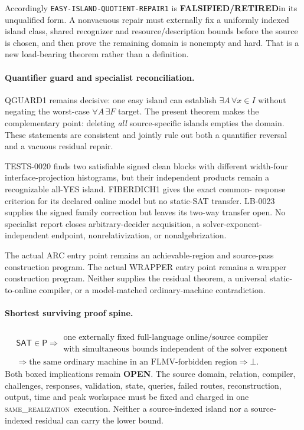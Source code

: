 \documentclass[11pt]{article}
\newcommand{\statusopen}{\textcolor{openstatus}{\textbf{OPEN}}}
\newcommand{\statusretired}{\textcolor{retired}{\textbf{FALSIFIED/RETIRED}}}
\newcommand{\same}{\textnormal{\textsc{same\_realization}}}
\begin{document}
Accordingly \texttt{EASY-ISLAND-QUOTIENT-REPAIR1} is
\statusretired in its unqualified form.  A nonvacuous repair must externally
fix a uniformly indexed island class, shared recognizer and resource/description
bounds before the source is chosen, and then prove the remaining domain is
nonempty and hard.  That is a new load-bearing theorem rather than a
definition.

\paragraph{Quantifier guard and specialist reconciliation.}
QGUARD1 remains decisive: one easy island can establish
\(\exists A\,\forall x\in I\) without negating the worst-case
\(\forall A\,\exists F\) target.  The present theorem makes the complementary
point: deleting \emph{all} source-specific islands empties the domain.  These
statements are consistent and jointly rule out both a quantifier reversal and
a vacuous residual repair.

TESTS-0020 finds two satisfiable signed clean blocks with different
width-four interface-projection histograms, but their independent products
remain a recognizable all-YES island.  FIBERDICH1 gives the exact common-
response criterion for its declared online model but no static-SAT transfer.
LB-0023 supplies the signed family correction but leaves its two-way transfer
open.  No specialist report closes arbitrary-decider acquisition, a
solver-exponent-independent endpoint, nonrelativization, or nonalgebrization.

The actual ARC entry point  remains an achievable-region and
source-pass construction program.  The actual WRAPPER entry point
 remains a wrapper construction program.  Neither supplies
the residual theorem, a universal static-to-online compiler, or a model-matched
ordinary-machine contradiction.

\paragraph{Shortest surviving proof spine.}
\[
\begin{gathered}
\mathsf{SAT}\in\mathsf P
\Longrightarrow
\boxed{\begin{array}{c}
\text{one externally fixed full-language online/source compiler}\\
\text{with simultaneous bounds independent of the solver exponent}
\end{array}}\\
\Longrightarrow
\boxed{\text{the same ordinary machine in an FLMV-forbidden region}}
\Longrightarrow\bot .
\end{gathered}
\]
Both boxed implications remain \statusopen.  The source domain, relation,
compiler, challenges, responses, validation, state, queries, failed routes,
reconstruction, output, time and peak workspace must be fixed and charged in
one \same\ execution.  Neither a source-indexed island nor a source-indexed
residual can carry the lower bound.
\end{document}
